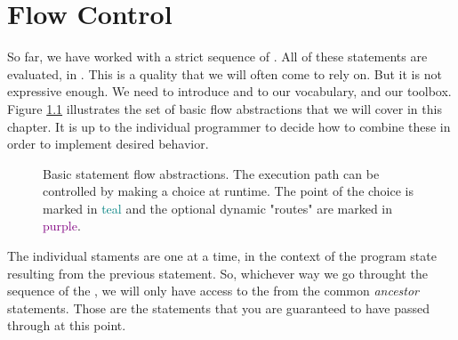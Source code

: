 \chapter{Flow Control}

So far, we have worked with a strict sequence of . All of these statements are evaluated, in . This is a quality that we will often come to rely on. But it is not expressive enough. We need to introduce  and  to our vocabulary, and our toolbox. Figure \ref{fig:flow:types} illustrates the set of basic flow abstractions that we will cover in this chapter. It is up to the individual programmer to decide how to combine these in order to implement desired behavior.

\begin{figure}[tbp]
  
  \caption[Basic statement flow abstractions]{Basic statement flow abstractions. The execution path can be controlled by making a choice at runtime. The point of the choice is marked in \textcolor{teal}{teal} and the optional dynamic "routes" are marked in \textcolor{purple}{purple}.}
  \label{fig:flow:types}
\end{figure}

The individual staments are  one at a time, in the context of the program state resulting from the previous statement. So, whichever way we go throught the sequence of the , we will only have access to the  from the common \textsl{ancestor} statements. Those are the statements that you are guaranteed to have passed through at this point.





